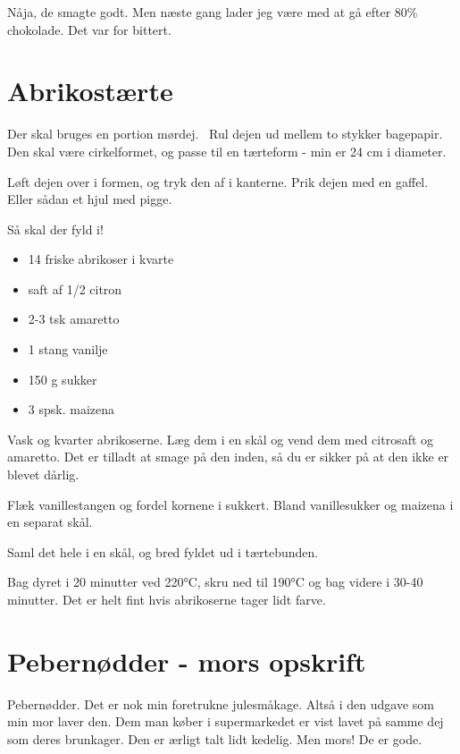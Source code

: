 \documentclass[
]{book}
\providecommand{\tightlist}{%
  \setlength{\itemsep}{0pt}\setlength{\parskip}{0pt}}
\begin{document}
Nåja, de smagte godt. Men næste gang lader jeg være med at gå efter 80\% chokolade. Det var for bittert.

\hypertarget{abrikostuxe6rte}{%
\section{Abrikostærte}\label{abrikostuxe6rte}}

Der skal bruges en portion mørdej.~ Rul dejen ud mellem to stykker bagepapir. Den skal være cirkelformet, og passe til en tærteform - min er 24 cm i diameter.

Løft dejen over i formen, og tryk den af i kanterne. Prik dejen med en gaffel. Eller sådan et hjul med pigge.

Så skal der fyld i!

\begin{itemize}
\tightlist
\item
  14 friske abrikoser i kvarte
\item
  saft af 1/2 citron
\item
  2-3 tsk amaretto
\item
  1 stang vanilje
\item
  150 g sukker
\item
  3 spsk. maizena
\end{itemize}

Vask og kvarter abrikoserne. Læg dem i en skål og vend dem med citrosaft og amaretto. Det er tilladt at smage på den inden, så du er sikker på at den ikke er blevet dårlig.

Flæk vanillestangen og fordel kornene i sukkert. Bland vanillesukker og maizena i en separat skål.

Saml det hele i en skål, og bred fyldet ud i tærtebunden.

Bag dyret i 20 minutter ved 220°C, skru ned til 190°C og bag videre i 30-40 minutter. Det er helt fint hvis abrikoserne tager lidt farve.

\hypertarget{pebernuxf8dder---mors-opskrift}{%
\section{Pebernødder - mors opskrift}\label{pebernuxf8dder---mors-opskrift}}

Pebernødder. Det er nok min foretrukne julesmåkage. Altså i den udgave som min mor laver den. Dem man køber i supermarkedet er vist lavet på samme dej som deres brunkager. Den er ærligt talt lidt kedelig. Men mors! De er gode.
\end{document}
